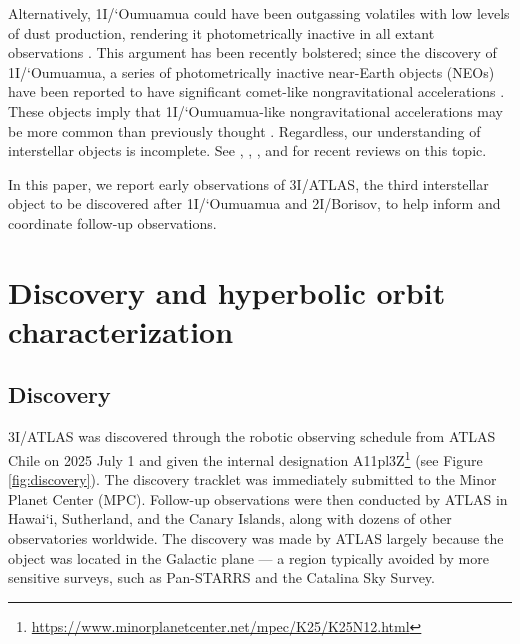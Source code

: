 \documentclass[linenumbers,twocolumn,longbib]{aastex7}
\begin{document}
Alternatively, 1I/`Oumuamua could have been outgassing volatiles with low levels of dust production, rendering it photometrically inactive in all extant observations \citep{Micheli2018,Sekanina2019,Seligman2020,Levine2021,Levine2021_h2,desch20211i,jackson20211i,Desch2022,Bergner2023}. This argument has been recently bolstered; since the discovery of 1I/`Oumuamua, a series of photometrically inactive near-Earth objects (NEOs) have been reported to have significant comet-like nongravitational accelerations \citep{Farnocchia2023,Seligman2023b,Seligman2024PNAS}. These objects imply that 1I/`Oumuamua-like nongravitational accelerations may be more common than previously thought \citep{Taylor2024}. Regardless, our understanding of interstellar objects is incomplete. See \citet{Fitzsimmons2024}, \citet{Seligman2023}, \citet{Jewitt2023ARAA}, and \citet{MoroMartin2022} for recent reviews on this topic.

In this paper, we report early observations of 3I/ATLAS, the third interstellar object to be discovered after 1I/`Oumuamua and 2I/Borisov,  to help inform and coordinate follow-up observations.
\section{Discovery and hyperbolic orbit characterization}\label{sec:orbit}


\subsection{Discovery}

3I/ATLAS was discovered through the robotic observing schedule from ATLAS Chile \citep{Tonry2018a} on 2025 July 1 and given the internal designation A11pl3Z\footnote{\url{https://www.minorplanetcenter.net/mpec/K25/K25N12.html}} (see Figure \ref{fig:discovery}). The discovery tracklet was immediately submitted to the Minor Planet Center (MPC). Follow-up observations were then conducted by ATLAS in Hawai`i, Sutherland, and the Canary Islands, along with dozens of other observatories worldwide. The discovery was made by ATLAS largely because the object was located in the Galactic plane --- a region typically avoided by more sensitive surveys, such as Pan-STARRS and the Catalina Sky Survey.
\end{document}
